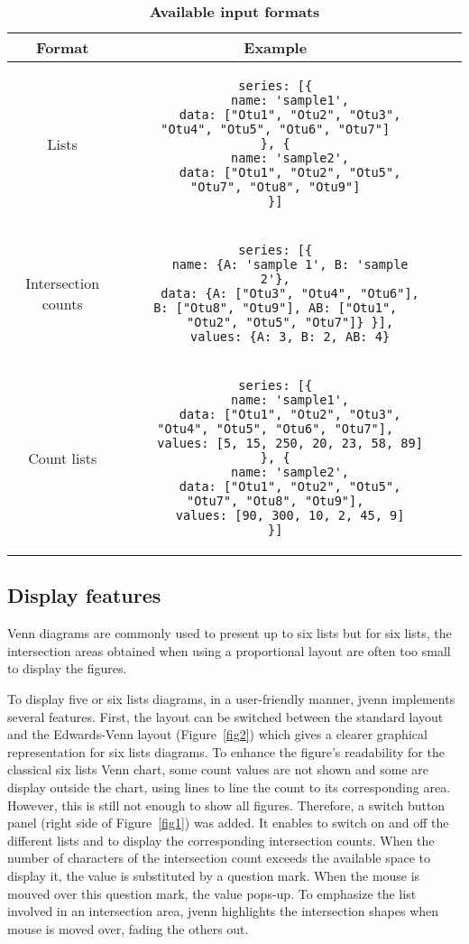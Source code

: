 \documentclass[11pt]{bmc_article_s50}
\begin{document}
\begin{table}[h!]
\caption{\bf Available input formats}\label{tab2}
      \begin{tabular}{cccc}
        \hline
        \textbf{Format}&\textbf{Example}\\ \hline
        Lists &
\begin{lstlisting}
series: [{
    name: 'sample1',
    data: ["Otu1", "Otu2", "Otu3", "Otu4", "Otu5", "Otu6", "Otu7"]
}, {
    name: 'sample2',
    data: ["Otu1", "Otu2", "Otu5", "Otu7", "Otu8", "Otu9"]
}]
\end{lstlisting}\\ \hline
        Intersection counts &
\begin{lstlisting}
series: [{
    name: {A: 'sample 1', B: 'sample 2'},
    data: {A: ["Otu3", "Otu4", "Otu6"], B: ["Otu8", "Otu9"], AB: ["Otu1",
    "Otu2", "Otu5", "Otu7"]} }],
    values: {A: 3, B: 2, AB: 4}
\end{lstlisting}\\ \hline
        Count lists  &
\begin{lstlisting}
series: [{
    name: 'sample1',
    data: ["Otu1", "Otu2", "Otu3", "Otu4", "Otu5", "Otu6", "Otu7"],
    values: [5, 15, 250, 20, 23, 58, 89]
}, {
    name: 'sample2',
    data: ["Otu1", "Otu2", "Otu5", "Otu7", "Otu8", "Otu9"],
    values: [90, 300, 10, 2, 45, 9]
}]
\end{lstlisting}\\ \hline
      \end{tabular}
\end{table}

\subsection*{Display features}

Venn diagrams are commonly used to present up to six lists but for six
lists, the intersection areas obtained when using a proportional layout are
often too small to display the figures.

To display five or six lists diagrams, in a user-friendly manner, jvenn
implements several features.
First, the layout can be switched between the standard layout and the
Edwards-Venn layout (Figure~\ref{fig2}) which gives a clearer graphical
representation for six lists diagrams. To enhance the figure's readability for
the classical six lists Venn chart, some count values are not shown and some are
display outside the chart, using lines to line the count to its corresponding
area. However, this is still not enough to show all figures. Therefore, a switch
button panel (right side of Figure~\ref{fig1}) was added. It enables to
switch on and off the different lists and to display the corresponding
intersection counts.
When the number of characters of the intersection count exceeds the available
space to display it, the value is substituted by a question mark. When the mouse
is mouved over this question mark, the value pops-up. To emphasize the list
involved in an intersection area, jvenn highlights the intersection shapes when
mouse is moved over, fading the others out.
\end{document}
